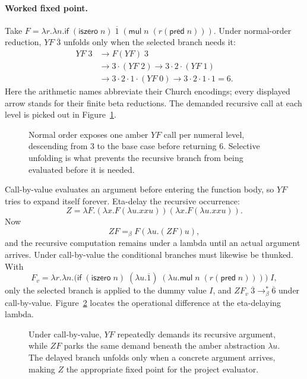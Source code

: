 \paragraph{Worked fixed point.}
Take \(F=\lambda r.\lambda n.\mathsf{if}\;(\mathsf{iszero}\;n)
\;\overline1\;(\mathsf{mul}\;n\;(r(\mathsf{pred}\;n)))\).  Under normal-order
reduction, \(YF\;\overline3\) unfolds only when the selected branch needs it:
\[
\begin{aligned}
 YF\;3&\to F(YF)\;3\\
 &\to 3\cdot(YF\;2)
 \to 3\cdot2\cdot(YF\;1)\\
 &\to3\cdot2\cdot1\cdot(YF\;0)
 \to3\cdot2\cdot1\cdot1=6.
\end{aligned}
\]
Here the arithmetic names abbreviate their Church encodings; every displayed
arrow stands for their finite beta reductions.
The demanded recursive call at each level is picked out in
Figure~\ref{fig:factorial-unfold}.

\begin{figure}[ht]
\centering

\caption{Normal order exposes one amber $YF$ call per numeral level, descending from $3$ to the base case before returning $6$.  Selective unfolding is what prevents the recursive branch from being evaluated before it is needed.}
\label{fig:factorial-unfold}
\end{figure}

Call-by-value evaluates an argument before entering the function body, so
\(YF\) tries to expand itself forever.  Eta-delay the recursive occurrence:
\[
 Z=\lambda F.
 (\lambda x.F(\lambda u.xxu))
 (\lambda x.F(\lambda u.xxu)).
\]
Now
\[
 ZF=_\beta F(\lambda u.(ZF)u),
\]
and the recursive computation remains under a lambda until an actual argument
arrives.  Under call-by-value the conditional branches must likewise be
thunked.  With
\[
 F_v=\lambda r.\lambda n.
 \bigl(\mathsf{if}\;(\mathsf{iszero}\;n)\;
   (\lambda u.\overline1)\;
   (\lambda u.\mathsf{mul}\;n\;(r(\mathsf{pred}\;n)))\bigr)\;I,
\]
only the selected branch is applied to the dummy value \(I\), and
\(ZF_v\;\overline3\to_\beta^*\overline6\) under call-by-value.
Figure~\ref{fig:y-vs-z-cbv} locates the operational difference at the
eta-delaying lambda.

\begin{figure}[t]
\centering

\caption{Under call-by-value, $YF$ repeatedly demands its recursive argument, while $ZF$ parks the same demand beneath the amber abstraction $\lambda u$.  The delayed branch unfolds only when a concrete argument arrives, making $Z$ the appropriate fixed point for the project evaluator.}
\label{fig:y-vs-z-cbv}
\end{figure}

